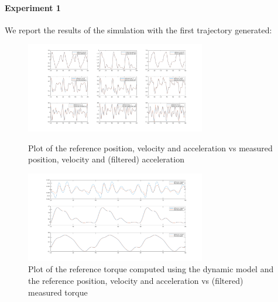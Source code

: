 \documentclass{article}
\begin{document}
\paragraph{Experiment 1}
We report the results of the simulation with the first trajectory generated:
\begin{figure}[!htbp]
\centering
\includegraphics[width=0.7\textwidth]{images/3-dof/experiment1_traj.png}
\caption{Plot of the reference position, velocity and acceleration vs measured position, velocity and (filtered) acceleration}
\includegraphics[width=0.7\textwidth]{images/3-dof/experiment1.png}
\caption{Plot of the reference torque computed using the dynamic model and the reference position, velocity and acceleration vs (filtered) measured torque}
\end{figure}
\pagebreak
\end{document}
